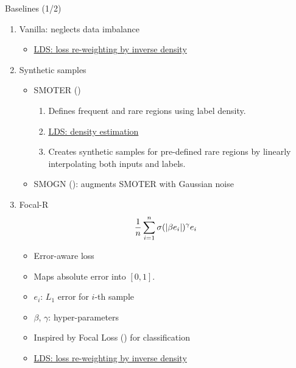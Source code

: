 \begin{frame}{Baselines (1/2)}
	\begin{enumerate}\footnotesize\setlength\itemsep{0.5em}
		\item<1-> Vanilla: neglects data imbalance
		\begin{itemize}\footnotesize
			\item[+]<2-> \underline{LDS: loss re-weighting by inverse density}
		\end{itemize}
		\item<3-> Synthetic samples
		\begin{itemize}\footnotesize
			\item SMOTER (\cite{torgo2013smote})
			\begin{enumerate}
				\item Defines frequent and rare regions using label density.
				\item[+]<4-> \underline{LDS: density estimation}
				\item Creates synthetic samples for pre-defined rare regions by linearly interpolating both inputs and labels.
			\end{enumerate}
			\item SMOGN (\cite{branco2017smogn}): augments SMOTER with Gaussian noise
		\end{itemize}\footnotesize
		\item<5-> Focal-R
		\begin{equation*}\footnotesize
			\frac{1}{n} \sum_{i=1}^n \sigma(|\beta e_i|)^\gamma e_i
		\end{equation*}
		\begin{itemize}
			\item Error-aware loss
			\item Maps absolute error into $[0, 1]$.
			\item $e_i$: $L_1$ error for $i$-th sample
			\item $\beta$, $\gamma$: hyper-parameters
			\item Inspired by Focal Loss (\cite{lin2017focal}) for classification
			\item[+]<6-> \underline{LDS: loss re-weighting by inverse density}
		\end{itemize}
	\end{enumerate}
\end{frame}

